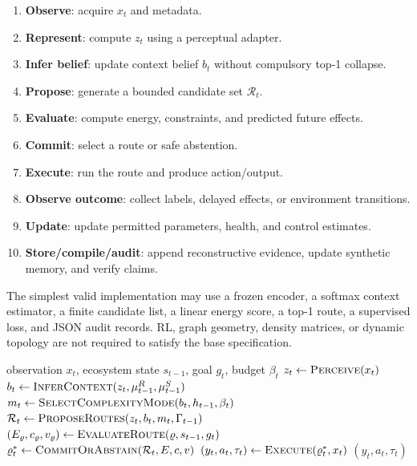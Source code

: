 \documentclass[10pt]{article}
\newcommand{\Rset}{\mathcal{R}}
\begin{document}
\begin{enumerate}
  \item \textbf{Observe}: acquire $x_t$ and metadata.
  \item \textbf{Represent}: compute $z_t$ using a perceptual adapter.
  \item \textbf{Infer belief}: update context belief $b_t$ without compulsory top-1 collapse.
  \item \textbf{Propose}: generate a bounded candidate set $\Rset_t$.
  \item \textbf{Evaluate}: compute energy, constraints, and predicted future effects.
  \item \textbf{Commit}: select a route or safe abstention.
  \item \textbf{Execute}: run the route and produce action/output.
  \item \textbf{Observe outcome}: collect labels, delayed effects, or environment transitions.
  \item \textbf{Update}: update permitted parameters, health, and control estimates.
  \item \textbf{Store/compile/audit}: append reconstructive evidence, update synthetic memory, and verify claims.
\end{enumerate}

The simplest valid implementation may use a frozen encoder, a softmax context estimator, a finite candidate list, a linear energy score, a top-1 route, a supervised loss, and JSON audit records. RL, graph geometry, density matrices, or dynamic topology are not required to satisfy the base specification.

\begin{algorithm}[t]
\caption{EcoSpec inference and action}
\label{alg:inference}
\begin{algorithmic}[1]
\Require observation $x_t$, ecosystem state $s_{t-1}$, goal $g_t$, budget $\beta_t$
\State $z_t\gets\textsc{Perceive}(x_t)$
\State $b_t\gets\textsc{InferContext}(z_t,\mu_{t-1}^R,\mu_{t-1}^S)$
\State $m_t\gets\textsc{SelectComplexityMode}(b_t,h_{t-1},\beta_t)$
\State $\Rset_t\gets\textsc{ProposeRoutes}(z_t,b_t,m_t,\Gamma_{t-1})$
\ForAll{$\varrho\in\Rset_t$}
  \State $(E_\varrho,c_\varrho,v_\varrho)\gets\textsc{EvaluateRoute}(\varrho,s_{t-1},g_t)$
\EndFor
\State $\varrho_t^*\gets\textsc{CommitOrAbstain}(\Rset_t,E,c,v)$
\State $(y_t,a_t,\tau_t)\gets\textsc{Execute}(\varrho_t^*,x_t)$
\State \Return $(y_t,a_t,\tau_t)$
\end{algorithmic}
\end{algorithm}
\end{document}
